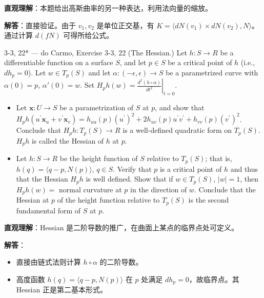 \begin{solution}
\textbf{直观理解}：本题给出高斯曲率的另一种表达，利用法向量的缩放。

\textbf{解答}：直接验证。由于 $v_1, v_2$ 是单位正交基，有 $K = \langle dN(v_1) \times dN(v_2), N \rangle$。通过计算 $d(fN)$ 可得所给公式。
\end{solution}

\begin{exercise}{3-3, 22* — do Carmo, Exercise 3-3, 22}
(The Hessian.) Let $h \colon S \to R$ be a differentiable function on a surface $S$, and let $p \in S$ be a critical point of $h$ (i.e., $dh_p = 0$). Let $w \in T_p(S)$ and let $\alpha \colon (-\epsilon , \epsilon) \to S$ be a parametrized curve with $\alpha(0) = p$, $\alpha'(0) = w$. Set $H _ {p} h (w) = \left. \frac {d ^ {2} (h \circ \alpha)}{d t ^ {2}} \right| _ {t = 0}$.
\begin{itemize}
\item[a.] Let $\mathbf{x}\colon U\to S$ be a parametrization of $S$ at $p$, and show that $H _ {p} h (u ^ {\prime} \mathbf {x} _ {u} + v ^ {\prime} \mathbf {x} _ {v}) = h _ {u u} (p) (u ^ {\prime}) ^ {2} + 2 h _ {u v} (p) u ^ {\prime} v ^ {\prime} + h _ {v v} (p) (v ^ {\prime}) ^ {2}$. Conclude that $H_{p}h \colon T_{p}(S) \to R$ is a well-defined quadratic form on $T_{p}(S)$. $H_{p}h$ is called the Hessian of $h$ at $p$.
\item[b.] Let $h \colon S \to R$ be the height function of $S$ relative to $T_p(S)$; that is, $h(q) = \langle q - p, N(p) \rangle$, $q \in S$. Verify that $p$ is a critical point of $h$ and thus that the Hessian $H_p h$ is well defined. Show that if $w \in T_p(S)$, $|w| = 1$, then $H_{p}h(w) =$ normal curvature at $p$ in the direction of $w$. Conclude that the Hessian at $p$ of the height function relative to $T_p(S)$ is the second fundamental form of $S$ at $p$.
\end{itemize}
\end{exercise}

\begin{solution}
\textbf{直观理解}：Hessian 是二阶导数的推广，在曲面上某点的临界点处可定义。

\textbf{解答}：
\begin{itemize}
\item[a.] 直接由链式法则计算 $h \circ \alpha$ 的二阶导数。
\item[b.] 高度函数 $h(q) = \langle q-p, N(p) \rangle$ 在 $p$ 处满足 $dh_p = 0$，故临界点。其 Hessian 正是第二基本形式。
\end{itemize}
\end{solution}

